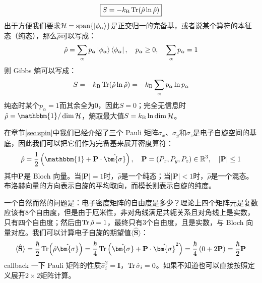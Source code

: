 \[\boxed{S=-k_{\rm B}\Tr(\hat{\rho}\ln\hat{\rho})}\]
出于方便我们要求$\mathcal{H}=\text{span}\{\ket{\phi_{\alpha}}\}$是正交归一的完备基，或者说某个算符的本征态（纯态），那么$\hat{\rho}$可以写成：
\[\hat{\rho}=\sum_{\alpha}p_{\alpha}\ket{\phi_{\alpha}}\bra{\phi_{\alpha}}, \quad p_{\alpha}\ge 0, \quad \sum_{\alpha}p_{\alpha}=1\]
则 Gibbs 熵可以写成：
\[S=-k_{\rm B}\Tr(\hat{\rho}\ln\hat{\rho})=-k_{\rm B}\sum_{\alpha}p_{\alpha}\ln p_{\alpha}\]
纯态时某个$p_{\alpha}=1$而其余全为$0$，因此$S=0$；完全无信息时$\hat{\rho}=\mathbbm{1}/\dim\mathcal{H}$，熵取最大值$S=k_{\rm B}\ln\dim\mathcal{H}$。
\begin{proposition}[单电子自旋系统]
在章节\ref{sec:spin}中我们已经介绍了三个 Pauli 矩阵$\sigma_x$、$\sigma_y$和$\sigma_z$是电子自旋空间的基底，因此我们可以把它们作为完备基来展开密度算符：
\[\hat{\rho}=\frac{1}{2}\left(\mathbbm{1}+\mathbf{P}\cdot\hat{\bm{\sigma}}\right), \quad \mathbf{P}=(P_x,P_y,P_z)\in\mathbb{R}^3, \quad |\mathbf{P}|\le 1\]
其中$\mathbf{P}$是 Bloch 向量。当$|\mathbf{P}|=1$时，$\hat{\rho}$是一个纯态；当$|\mathbf{P}|<1$时，$\hat{\rho}$是一个混态。布洛赫向量的方向表示自旋的平均取向，而模长则表示自旋的纯度。

一个自然而然的问题是：电子密度矩阵的自由度是多少？理论上四个矩阵元是复数应该有8个自由度，但是由于厄米性，非对角线满足共轭关系且对角线上是实数，只有四个自由度；然后由$\Tr\hat{\rho}=1$，最终只有3个自由度，且是实数，与 Bloch 向量对应。我们可以计算电子自旋的期望值$\langle\hat{\mathbf{S}}\rangle$：
\[\langle\hat{\mathbf{S}}\rangle=\frac{\hbar}{2}\Tr(\hat{\rho}\hat{\bm{\sigma}})=\frac{\hbar}{4}\Tr\left(\hat{\bm{\sigma}}+\mathbf{P}\cdot\hat{\bm{\sigma}}^2\right)=\frac{\hbar}{4}\left(0+2\mathbf{P}\right)=\frac{\hbar}{2}\mathbf{P}\]
callback 一下 Pauli 矩阵的性质$\hat{\sigma}^2_i=\mathbf{I}$，$\Tr\hat{\sigma}_i=0$。如果不知道也可以直接按照定义展开$2 \times 2$矩阵计算。
\end{proposition}

